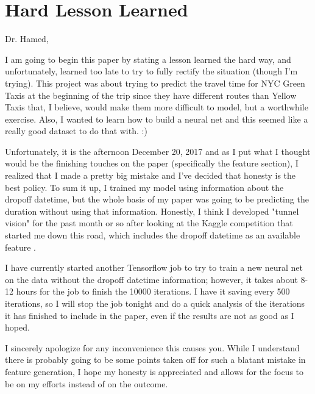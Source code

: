 \documentclass[conference]{IEEEtran}
\begin{document}

\section{Hard Lesson Learned}
Dr. Hamed,

I am going to begin this paper by stating a lesson learned the hard way, and unfortunately, learned too late to try to fully rectify the situation (though I'm trying). This project was about trying to predict the travel time for NYC Green Taxis at the beginning of the trip since they have different routes than Yellow Taxis that, I believe, would make them more difficult to model, but a worthwhile exercise.  Also, I wanted to learn how to build a neural net and this seemed like a really good dataset to do that with. :)

Unfortunately, it is the afternoon December 20, 2017 and as I put what I thought would be the finishing touches on the paper (specifically the feature section), I realized that I made a pretty big mistake and I've decided that honesty is the best policy.  To sum it up, I trained my model using information about the dropoff datetime, but the whole basis of my paper was going to be predicting the duration without using that information. Honestly, I think I developed "tunnel vision"  for the past month or so after looking at the Kaggle competition that started me down this road, which includes the dropoff datetime as an available feature \cite{kaggle}. 

 I have currently started another Tensorflow job to try to train a new neural net on the data without the dropoff datetime information; however, it takes about 8-12 hours for the job to finish the 10000 iterations.  I have it saving every 500 iterations, so I will stop the job tonight and do a quick analysis of the iterations it has finished to include in the paper, even if the results are not as good as I hoped.

I sincerely apologize for any inconvenience this causes you.  While I understand there is probably going to be some points taken off for such a blatant mistake in feature generation,  I hope my honesty is appreciated and allows for the focus to be on my efforts instead of on the outcome.
\end{document}
